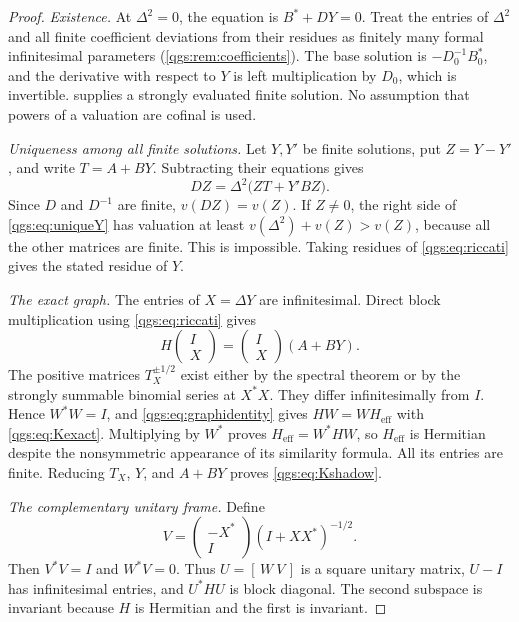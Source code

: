 \documentclass[11pt,oneside]{article}
\numberwithin{equation}{section}
\theoremstyle{plain}
\theoremstyle{definition}
\theoremstyle{remark}
\newcommand{\Heff}{H_{\mathrm{eff}}}
\begin{document}
\begin{proof}
\textit{Existence.}
At $\Delta^2=0$, the equation is $B^*+DY=0$. Treat the entries of $\Delta^2$ and all finite coefficient deviations from their residues as finitely many formal infinitesimal parameters (\cref{qgs:rem:coefficients}). The base solution is $-D_0^{-1}B_0^*$, and the derivative with respect to $Y$ is left multiplication by $D_0$, which is invertible.  supplies a strongly evaluated finite solution. No assumption that powers of a valuation are cofinal is used.

\textit{Uniqueness among all finite solutions.}
Let $Y,Y'$ be finite solutions, put $Z=Y-Y'$, and write $T=A+BY$. Subtracting their equations gives
\begin{equation}\label{qgs:eq:uniqueY}
 DZ=\Delta^2\bigl(ZT+Y'BZ\bigr).
\end{equation}
Since $D$ and $D^{-1}$ are finite, $v(DZ)=v(Z)$. If $Z\ne0$, the right side of \eqref{qgs:eq:uniqueY} has valuation at least $v(\Delta^2)+v(Z)>v(Z)$, because all the other matrices are finite. This is impossible. Taking residues of \eqref{qgs:eq:riccati} gives the stated residue of $Y$.

\textit{The exact graph.}
The entries of $X=\Delta Y$ are infinitesimal. Direct block multiplication using \eqref{qgs:eq:riccati} gives
\begin{equation}\label{qgs:eq:graphidentity}
 H\begin{pmatrix}I\\X\end{pmatrix}
 =\begin{pmatrix}I\\X\end{pmatrix}(A+BY).
\end{equation}
The positive matrices $T_X^{\pm1/2}$ exist either by the spectral theorem or by the strongly summable binomial series at $X^*X$. They differ infinitesimally from $I$. Hence $W^*W=I$, and \eqref{qgs:eq:graphidentity} gives $HW=W\Heff$ with \eqref{qgs:eq:Kexact}. Multiplying by $W^*$ proves $\Heff=W^*HW$, so $\Heff$ is Hermitian despite the nonsymmetric appearance of its similarity formula. All its entries are finite. Reducing $T_X$, $Y$, and $A+BY$ proves \eqref{qgs:eq:Kshadow}.

\textit{The complementary unitary frame.}
Define
\[
 V=\begin{pmatrix}-X^*\\I\end{pmatrix}(I+XX^*)^{-1/2}.
\]
Then $V^*V=I$ and $W^*V=0$. Thus $U=[\,W\ V\,]$ is a square unitary matrix, $U-I$ has infinitesimal entries, and $U^*HU$ is block diagonal. The second subspace is invariant because $H$ is Hermitian and the first is invariant.


\end{proof}
\end{document}
